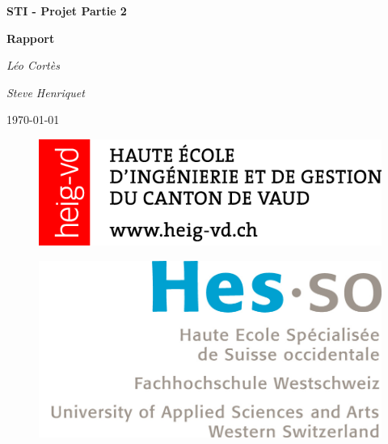 \documentclass[12pt,a4paper]{report}
\begin{document}
\begin{titlepage}
	{
		\centering
		{\huge\bfseries STI - Projet Partie 2\par}
		\vspace{1.5cm}
		{\Large\bfseries Rapport\par}
		\vspace{2cm}
		{\large\itshape Léo Cortès\par}
		\vspace{0.25cm}
		{\large\itshape Steve Henriquet\par}

		\vfill

		{\large \today\par}
	}
	
	\begin{figure}[H]
		\noindent
		\begin{minipage}{0.3\textwidth}%
			\href{https://heig-vd.ch}{\includegraphics[scale=0.5,left]{HEIG-VD-logo.png}}
		\end{minipage}%
	\hfill%
	\begin{minipage}{0.3\textwidth}\raggedleft
		\href{https://www.hes-so.ch/}{\includegraphics[scale=0.5,right]{HES-SO-logo.jpg}}
		\end{minipage}
	\end{figure}
\end{titlepage}
\end{document}
